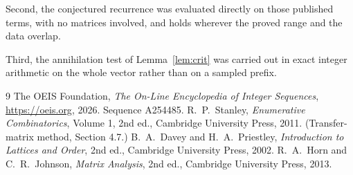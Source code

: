 \documentclass[11pt,a4paper]{article}
\theoremstyle{plain}
\theoremstyle{definition}
\begin{document}
Second, the conjectured recurrence was evaluated directly on those published terms, with no
matrices involved, and holds wherever the proved range and the data overlap.

Third, the annihilation test of Lemma~\ref{lem:crit} was carried out in exact integer
arithmetic on the whole vector rather than on a sampled prefix.

\begin{thebibliography}{9}
 The OEIS Foundation, \emph{The On-Line Encyclopedia of Integer
Sequences}, \url{https://oeis.org}, 2026. Sequence A254485.
 R.~P.~Stanley, \emph{Enumerative Combinatorics}, Volume 1, 2nd ed.,
Cambridge University Press, 2011. (Transfer-matrix method, Section 4.7.)
 B.~A.~Davey and H.~A.~Priestley, \emph{Introduction to Lattices and
Order}, 2nd ed., Cambridge University Press, 2002.
 R.~A.~Horn and C.~R.~Johnson, \emph{Matrix Analysis}, 2nd ed., Cambridge
University Press, 2013.
\end{thebibliography}
\end{document}
